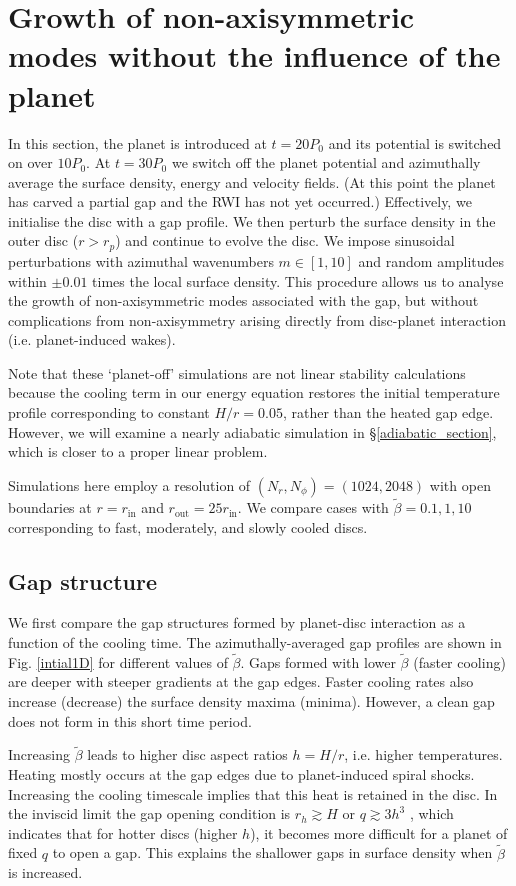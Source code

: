 \section{Growth of non-axisymmetric modes without the influence of the
  planet}\label{linear1} 
In this section, the planet is introduced at $t=20P_0$ and 
its potential is switched on over $10P_0$. At $t=30P_0$ we switch off the
planet potential and azimuthally average the surface density, energy
and velocity fields. (At this point the planet has carved a partial
gap and the RWI has not yet occurred.) Effectively, we initialise the
disc with a gap profile. 
We then perturb the surface density in the outer disc ($r>r_p$) and continue to 
evolve the disc. We impose  sinusoidal perturbations with 
azimuthal wavenumbers $m\in[1,10]$ and random amplitudes within $\pm 0.01$
times the local surface density. 
This procedure allows us to analyse the growth of 
non-axisymmetric modes associated with the gap, but without
complications from non-axisymmetry arising directly from disc-planet
interaction (i.e. planet-induced wakes). 

Note that these `planet-off' simulations are not linear stability
calculations because the cooling term in our energy equation
restores the initial temperature profile corresponding to constant
$H/r=0.05$, rather than the heated gap edge. However, we will 
examine a nearly adiabatic simulation in \S\ref{adiabatic_section},
which is closer to a proper linear problem. 

Simulations here employ a resolution of $(N_r,N_{\phi})=(1024,2048)$
with open boundaries at $r=r_\mathrm{in}$ and
$r_\mathrm{out}=25r_\mathrm{in}$. We compare cases with
$\tilde{\beta}=0.1,1,10$ corresponding to fast, moderately, 
and slowly cooled discs. 

\subsection{Gap structure}
We first compare the gap structures formed by planet-disc
interaction as a function of the cooling time. The azimuthally-averaged 
gap profiles are shown in Fig. \ref{intial1D} for different values of 
$\tilde\beta$. Gaps formed with lower $\tilde\beta$ (faster cooling) 
are deeper with steeper gradients at the gap edges. Faster cooling rates also 
increase (decrease) the surface density maxima (minima). However, a
clean gap does not form in this short time period.%


Increasing $\tilde\beta$ leads to higher disc aspect ratios $h=H/r$,
i.e. higher temperatures. Heating mostly occurs at the gap edges
due to planet-induced spiral shocks. Increasing the cooling timescale 
implies that this heat is retained in the disc. In the inviscid limit the gap
opening condition is $r_h\gtrsim H$ or $q\gtrsim 3h^3$
\citep{crida06}, which indicates that for hotter discs (higher
$h$), it becomes more difficult for a planet of fixed $q$ to open a
gap. This explains the shallower gaps in surface density when
$\tilde{\beta}$ is increased. 


